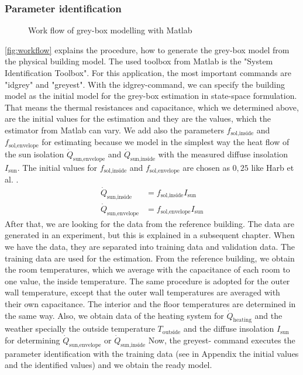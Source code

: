     \subsubsection{Parameter identification}
    \label{fig:WorkflowModel}
     \begin{figure}
            \centering
            \def\svgwidth{400pt}
            
            \caption{Work flow of grey-box modelling with Matlab}
            \label{fig:structureThermalModel}
        \end{figure}
    \autoref{fig:workflow} explains the procedure, how to generate the grey-box model from the physical building model.\newline 
    The used toolbox from Matlab is the "System Identification Toolbox". For this application, the most important commands are "idgrey" and "greyest".
    With the idgrey-command, we can specify the building model as the initial model for the grey-box estimation in state-space formulation. That means the thermal resistances and capacitance, which we determined above, are the initial values for the estimation and they are the values, which the estimator from Matlab can vary. We add also the parameters $f_\text{sol,inside}$ and $f_\text{sol,envelope}$ for estimating because we model in the simplest way the heat flow of the sun isolation $\dot{Q}_\text{sun,envelope}$ and $\dot{Q}_\text{sun,inside}$ with the measured diffuse insolation $I_\text{sun}$. The initial values for $f_\text{sol,inside}$ and $f_\text{sol,envelope}$ are chosen as $0,25$ like Harb et al. \cite{Harb.2016}. 
    \begin{align}
       \label{eq:sun}
        \dot{Q}_\text{sun,inside} &= f_\text{sol,inside} I_\text{sun} \\
        \dot{Q}_\text{sun,envelope} &= f_\text{sol,envelope} I_\text{sun} \nonumber 
    \end{align}
    After that, we are looking for the data from the reference building. The data are generated in an experiment, but this is explained in a subsequent chapter. When we have the data, they are separated into training data and validation data. The training data are used for the estimation. From the reference building, we obtain the room temperatures, which we average with the capacitance of each room to one value, the inside temperature. The same procedure is adopted for the outer wall temperature, except that the outer wall temperatures are averaged with their own capacitance. The interior and the floor temperatures are determined in the same way. Also, we obtain data of the heating system for $\dot{Q}_\text{heating}$ and the weather specially the outside temperature $T_\text{outside}$ and the diffuse insolation $I_\text{sun}$ for determining $\dot{Q}_\text{sun,envelope}$ or $\dot{Q}_\text{sun,inside}$ \newline
    Now, the greyest- command executes the parameter identification with the training data (see in Appendix the initial values and the identified values) and we obtain the ready model.
    
